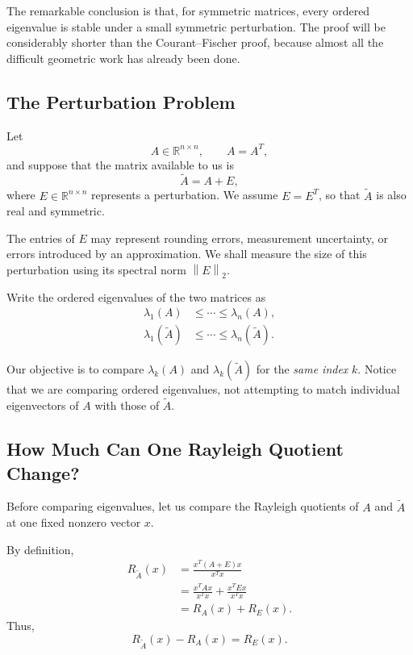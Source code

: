 \documentclass[14pt,letterpaper]{article}
\theoremstyle{plain}
\theoremstyle{definition}
\theoremstyle{remark}
\newcommand{\R}{\mathbb{R}}
\newcommand{\norm}[1]{\left\lVert #1 \right\rVert}
\begin{document}
The remarkable conclusion is that, for symmetric matrices,
every ordered eigenvalue is stable under a small symmetric
perturbation. The proof will be considerably shorter than
the Courant--Fischer proof, because almost all the difficult
geometric work has already been done.


\subsection{The Perturbation Problem}
\label{subsec:weyl_setup}

Let
\[
A\in\R^{n\times n},\qquad A=A^T,
\]
and suppose that the matrix available to us is
\[
\boxed{\widetilde A=A+E,}
\]
where $E\in\R^{n\times n}$ represents a perturbation.
We assume $E=E^T$, so that $\widetilde A$ is also
real and symmetric.

The entries of $E$ may represent rounding errors,
measurement uncertainty, or errors introduced by an
approximation. We shall measure the size of this
perturbation using its spectral norm $\norm{E}_2$.

Write the ordered eigenvalues of the two matrices as
\[
\begin{aligned}
\lambda_1(A)&\leq\cdots\leq\lambda_n(A),\\
\lambda_1(\widetilde A)&\leq\cdots\leq
\lambda_n(\widetilde A).
\end{aligned}
\]

Our objective is to compare $\lambda_k(A)$ and
$\lambda_k(\widetilde A)$ for the \emph{same index} $k$.
Notice that we are comparing ordered eigenvalues, not
attempting to match individual eigenvectors of $A$ with
those of $\widetilde A$.


\subsection{How Much Can One Rayleigh Quotient Change?}
\label{subsec:weyl_rayleigh}

Before comparing eigenvalues, let us compare the
Rayleigh quotients of $A$ and $\widetilde A$ at one
fixed nonzero vector $x$.

By definition,
\[
\begin{aligned}
R_{\widetilde A}(x)
&=\frac{x^T(A+E)x}{x^Tx}\\[3pt]
&=\frac{x^TAx}{x^Tx}+\frac{x^TEx}{x^Tx}\\[3pt]
&=R_A(x)+R_E(x).
\end{aligned}
\]
Thus,
\[
\boxed{R_{\widetilde A}(x)-R_A(x)=R_E(x).}
\]
\end{document}
